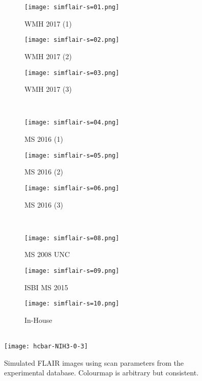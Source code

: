 \begin{figure}
  \centering
  \begin{subfigure}{0.25\textwidth}\centering\texttt{[image: simflair-s=01.png]}\caption{WMH 2017 (1)}\end{subfigure}
  \begin{subfigure}{0.25\textwidth}\centering\texttt{[image: simflair-s=02.png]}\caption{WMH 2017 (2)}\end{subfigure}
  \begin{subfigure}{0.25\textwidth}\centering\texttt{[image: simflair-s=03.png]}\caption{WMH 2017 (3)}\end{subfigure}\\[0.5em]
  \begin{subfigure}{0.25\textwidth}\centering\texttt{[image: simflair-s=04.png]}\caption{MS  2016 (1)}\end{subfigure}
  \begin{subfigure}{0.25\textwidth}\centering\texttt{[image: simflair-s=05.png]}\caption{MS  2016 (2)}\end{subfigure}
  \begin{subfigure}{0.25\textwidth}\centering\texttt{[image: simflair-s=06.png]}\caption{MS  2016 (3)}\end{subfigure}\\[0.5em]
  \begin{subfigure}{0.25\textwidth}\centering\texttt{[image: simflair-s=08.png]}\caption{MS  2008 UNC}\end{subfigure}
  \begin{subfigure}{0.25\textwidth}\centering\texttt{[image: simflair-s=09.png]}\caption{ISBI MS 2015}\end{subfigure}
  \begin{subfigure}{0.25\textwidth}\centering\texttt{[image: simflair-s=10.png]}\caption{In-House    }\end{subfigure}\\[0.5em]
  \texttt{[image: hcbar-NIH3-0-3]}
  \caption{Simulated FLAIR images using scan parameters from the experimental database. Colourmap is arbitrary but consistent.}
  \label{fig:simflair}
\end{figure}
